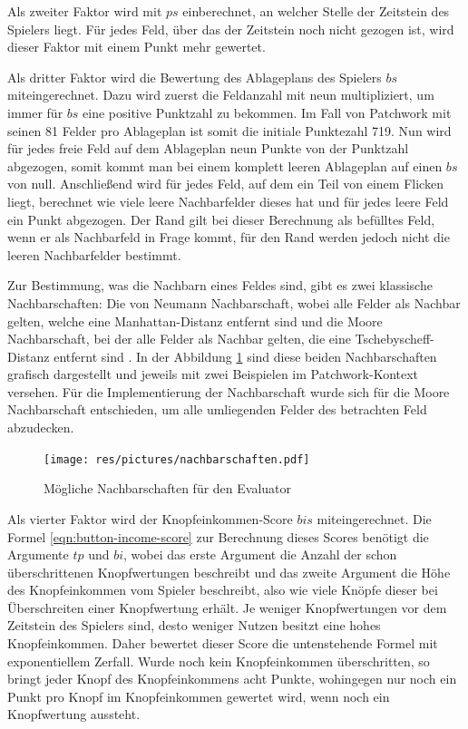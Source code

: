 Als zweiter Faktor wird mit $ps$ einberechnet, an welcher Stelle der Zeitstein des Spielers liegt. Für jedes Feld, über das der Zeitstein noch nicht gezogen ist, wird dieser Faktor mit einem Punkt mehr gewertet.

Als dritter Faktor wird die Bewertung des Ablageplans des Spielers $bs$ miteingerechnet. Dazu wird zuerst die Feldanzahl mit neun multipliziert, um immer für $bs$ eine positive Punktzahl zu bekommen. Im Fall von Patchwork mit seinen 81 Felder pro Ablageplan ist somit die initiale Punktezahl 719. Nun wird für jedes freie Feld auf dem Ablageplan neun Punkte von der Punktzahl abgezogen, somit kommt man bei einem komplett leeren Ablageplan auf einen $bs$ von null. Anschließend wird für jedes Feld, auf dem ein Teil von einem Flicken liegt, berechnet wie viele leere Nachbarfelder dieses hat und für jedes leere Feld ein Punkt abgezogen. Der Rand gilt bei dieser Berechnung als befülltes Feld, wenn er als Nachbarfeld in Frage kommt, für den Rand werden jedoch nicht die leeren Nachbarfelder bestimmt.

\pagebreak

Zur Bestimmung, was die Nachbarn eines Feldes sind, gibt es zwei klassische Nachbarschaften: Die von Neumann Nachbarschaft, wobei alle Felder als Nachbar gelten, welche eine Manhattan-Distanz entfernt sind und die Moore Nachbarschaft, bei der alle Felder als Nachbar gelten, die eine Tschebyscheff-Distanz entfernt sind \cite[S. 2]{2016.kneighborhood}. In der Abbildung \ref{fig:nachbarschaften} sind diese beiden Nachbarschaften grafisch dargestellt und jeweils mit zwei Beispielen im Patchwork-Kontext versehen. Für die Implementierung der Nachbarschaft wurde sich für die Moore Nachbarschaft entschieden, um alle umliegenden Felder des betrachten Feld abzudecken.

\vspace*{-0.25cm}
\begin{figure}[!ht]
    \centering
    \texttt{[image: res/pictures/nachbarschaften.pdf]}
    \vspace*{-0.45cm}
    \caption{Mögliche Nachbarschaften für den Evaluator}
    \label{fig:nachbarschaften}
\end{figure}
\vspace*{-0.2cm}

Als vierter Faktor wird der Knopfeinkommen-Score $bis$ miteingerechnet. Die Formel \ref{eqn:button-income-score} zur Berechnung dieses Scores benötigt die Argumente $tp$ und $bi$, wobei das erste Argument die Anzahl der schon überschrittenen Knopfwertungen beschreibt und das zweite Argument die Höhe des Knopfeinkommen vom Spieler beschreibt, also wie viele Knöpfe dieser bei Überschreiten einer Knopfwertung erhält. Je weniger Knopfwertungen vor dem Zeitstein des Spielers sind, desto weniger Nutzen besitzt eine hohes Knopfeinkommen. Daher bewertet dieser Score die untenstehende Formel mit exponentiellem Zerfall. Wurde noch kein Knopfeinkommen überschritten, so bringt jeder Knopf des Knopfeinkommens acht Punkte, wohingegen nur noch ein Punkt pro Knopf im Knopfeinkommen gewertet wird, wenn noch ein Knopfwertung aussteht.


